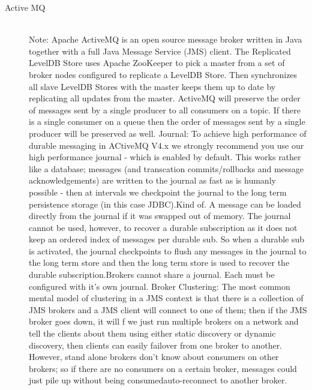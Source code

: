 \begin{description}
{    }
    \item [Active MQ] \hfill \\
        {Note: Apache ActiveMQ is an open source message broker written in Java
    together with a full Java Message Service (JMS) client. The Replicated
    LevelDB Store uses Apache ZooKeeper to pick a master from a set of broker
    nodes configured to replicate a LevelDB Store. Then synchronizes all slave
    LevelDB Stores with the master keeps them up to date by replicating all
    updates from the master. ActiveMQ will preserve the order of messages sent
    by a single producer to all consumers on a topic. If there is a single
    consumer on a queue then the order of messages sent by a single producer
    will be preserved as well. Journal: To achieve high performance of durable
    messaging in ACtiveMQ V4.x we strongly recommend you use our high
    performance journal - which is enabled by default. This works rather like a
    database; messages (and transcation commits/rollbacks and message
    acknowledgements) are written to the journal as fast as is humanly possible
    - then at intervals we checkpoint the journal to the long term persistence
    storage (in this case JDBC).Kind of. A message can be loaded directly from the journal if it was swapped out of memory.
    The journal cannot be used, however, to recover a durable subscription as it
    does not keep an ordered index of messages per durable sub. So when a durable
    sub is activated, the journal checkpoints to flush any messages in the journal
    to the long term store and then the long term store is used to recover the
    durable subscription.Brokers cannot share a journal. Each must be
configured with it's own journal. Broker Clustering: The most common mental model of clustering in
a JMS context is that there is a collection of JMS brokers and a JMS client
will connect to one of them; then if the JMS broker goes down, it will
f we just run multiple brokers on a network and tell the clients about them
using either static discovery or dynamic discovery, then clients can easily
failover from one broker to another. However, stand alone brokers don't know
about consumers on other brokers; so if there are no consumers on a certain
broker, messages could just pile up without being consumedauto-reconnect to
another broker. } 

\end{description}


